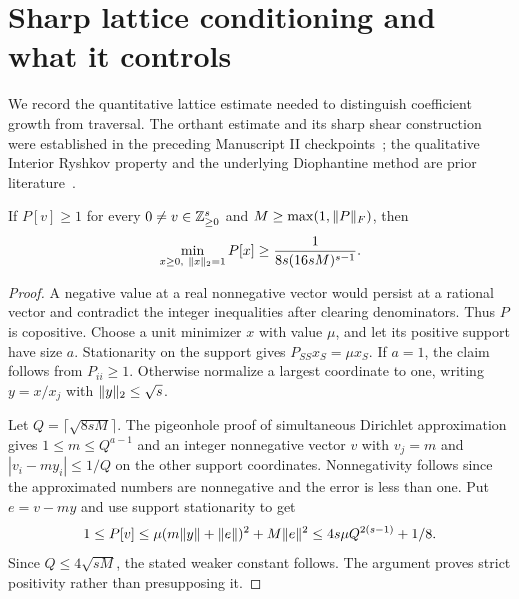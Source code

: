 \section{Sharp lattice conditioning and what it controls}\label{sec:lattice}
We record the quantitative lattice estimate needed to distinguish coefficient growth from traversal. The orthant estimate and its sharp shear construction were established in the preceding Manuscript II checkpoints~\cite{M2prior}; the qualitative Interior Ryshkov property and the underlying Diophantine method are prior literature~\cite{DSV21,OS26}.

\begin{lemma}\label{lem:orthantmargin}
If $P[v]\ge1$ for every $0\ne v\in\mathbb Z_{\ge0}^s$ and $M\ge\max(1,\lVert P\rVert_F)$, then
\[
 \min_{x\ge0,\ \lVert x\rVert_2=1}P[x]\ge\frac1{8s(16sM)^{s-1}}.
\]
\end{lemma}
\begin{proof}
A negative value at a real nonnegative vector would persist at a rational vector and contradict the integer inequalities after clearing denominators. Thus $P$ is copositive. Choose a unit minimizer $x$ with value $\mu$, and let its positive support have size $a$. Stationarity on the support gives $P_{SS}x_S=\mu x_S$. If $a=1$, the claim follows from $P_{ii}\ge1$. Otherwise normalize a largest coordinate to one, writing $y=x/x_j$ with $\lVert y\rVert_2\le\sqrt s$.

Let $Q=\lceil\sqrt{8sM}\rceil$. The pigeonhole proof of simultaneous Dirichlet approximation gives $1\le m\le Q^{a-1}$ and an integer nonnegative vector $v$ with $v_j=m$ and $|v_i-my_i|\le1/Q$ on the other support coordinates. Nonnegativity follows since the approximated numbers are nonnegative and the error is less than one. Put $e=v-my$ and use support stationarity to get
\[
 1\le P[v]\le\mu(m\lVert y\rVert+\lVert e\rVert)^2+M\lVert e\rVert^2
 \le4s\mu Q^{2(s-1)}+1/8.
\]
Since $Q\le4\sqrt{sM}$, the stated weaker constant follows. The argument proves strict positivity rather than presupposing it.
\end{proof}

